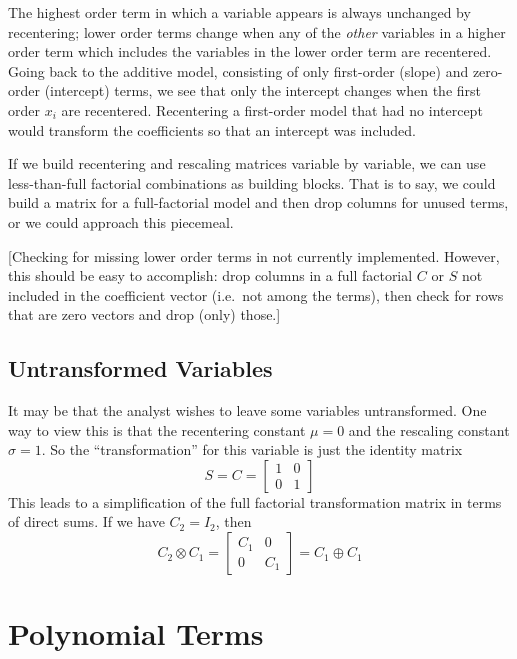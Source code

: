 \documentclass[]{article}
\begin{document}
The highest order term in which a variable appears is always unchanged
by recentering; lower order terms change when any of the \emph{other}
variables in a higher order term which includes the variables in the
lower order term are recentered. Going back to the additive model,
consisting of only first-order (slope) and zero-order (intercept) terms,
we see that only the intercept changes when the first order \(x_i\) are
recentered. Recentering a first-order model that had no intercept would
transform the coefficients so that an intercept was included.

If we build recentering and rescaling matrices variable by variable, we
can use less-than-full factorial combinations as building blocks. That
is to say, we could build a matrix for a full-factorial model and then
drop columns for unused terms, or we could approach this piecemeal.

{[}Checking for missing lower order terms in not currently implemented.
However, this should be easy to accomplish: drop columns in a full
factorial \(C\) or \(S\) not included in the coefficient vector
(i.e.~not among the terms), then check for rows that are zero vectors
and drop (only) those.{]}

\hypertarget{untransformed-variables}{%
\subsection{Untransformed Variables}\label{untransformed-variables}}

It may be that the analyst wishes to leave some variables untransformed.
One way to view this is that the recentering constant \(\mu=0\) and the
rescaling constant \(\sigma=1\). So the ``transformation'' for this
variable is just the identity matrix
\[S=C=\begin{bmatrix}1 & 0 \\ 0 &1 \end{bmatrix}\] This leads to a
simplification of the full factorial transformation matrix in terms of
direct sums. If we have \(C_2=I_2\), then
\[C_2 \otimes C_1 = \begin{bmatrix}C_1 &0 \\ 0 &C_1\end{bmatrix} = C_1 \oplus C_1 \]

\hypertarget{polynomial-terms}{%
\section{Polynomial Terms}\label{polynomial-terms}}
\end{document}
